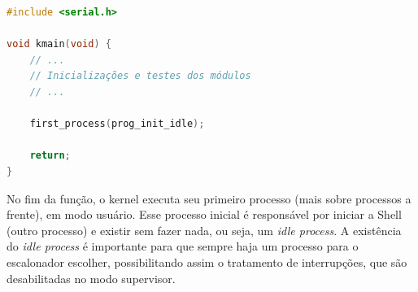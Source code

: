 \begin{lstlisting}[language=C, caption=Função principal.]
#include <serial.h>

void kmain(void) {
    // ...
    // Inicializações e testes dos módulos
    // ...

    first_process(prog_init_idle);

    return;
}
\end{lstlisting}

No fim da função, o kernel executa seu primeiro processo (mais sobre processos a frente), em modo usuário. Esse processo inicial é responsável por iniciar a Shell (outro processo) e existir sem fazer nada, ou seja, um \textit{idle process}. A existência do \textit{idle process} é importante para que sempre haja um processo para o escalonador escolher, possibilitando assim o tratamento de interrupções, que são desabilitadas no modo supervisor.
